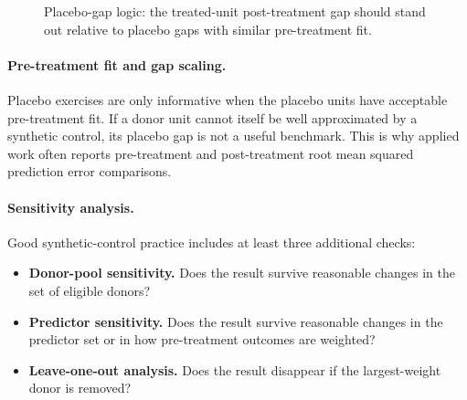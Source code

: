\begin{figure}[h]
\centering
{}
\caption{Placebo-gap logic: the treated-unit post-treatment gap should stand out relative to placebo gaps with similar pre-treatment fit.}
\label{fig:sc_placebos}
\end{figure}

\paragraph{Pre-treatment fit and gap scaling.}
Placebo exercises are only informative when the placebo units have acceptable pre-treatment fit. If a donor unit cannot itself be well approximated by a synthetic control, its placebo gap is not a useful benchmark. This is why applied work often reports pre-treatment and post-treatment root mean squared prediction error comparisons.

\paragraph{Sensitivity analysis.}
Good synthetic-control practice includes at least three additional checks:
\begin{itemize}
\item \textbf{Donor-pool sensitivity.} Does the result survive reasonable changes in the set of eligible donors?
\item \textbf{Predictor sensitivity.} Does the result survive reasonable changes in the predictor set or in how pre-treatment outcomes are weighted?
\item \textbf{Leave-one-out analysis.} Does the result disappear if the largest-weight donor is removed?
\end{itemize}

